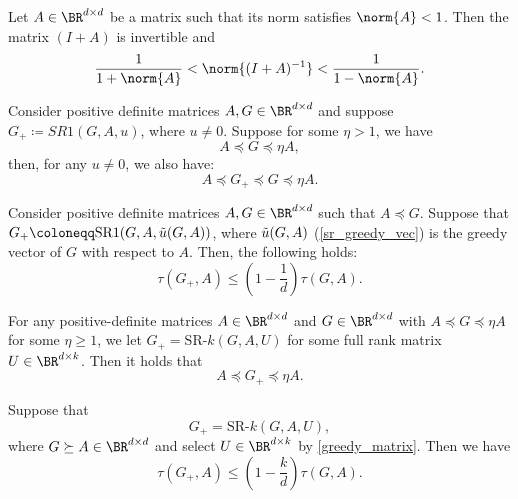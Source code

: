 \begin{lemma}
    Let $A \in \BR^{d \times d}$ be a matrix such that its norm satisfies $\norm{A} < 1$. Then the matrix $(I + A)$ is invertible and 
    \begin{equation*}
        \frac{1}{1 + \norm{A}} < \norm{(I + A)^{-1}} < \frac{1}{1 - \norm{A}}. 
    \end{equation*}
    \label{lemma:banach}
\end{lemma}
\begin{lemma}
    Consider positive definite matrices $A, G \in \BR^{d \times d}$ and suppose $G_{+} \coloneqq SR1(G, A, u)$, where $u \neq 0$. Suppose for some $\eta > 1$, we have
    \begin{equation*}
        A \preceq G \preceq \eta A,
    \end{equation*}
    then, for any $u \neq 0$, we also have:
    \begin{equation*}
        A \preceq G_{+} \preceq G \preceq \eta A.
    \end{equation*}
    \label{lemma:sr1_one_step}
\end{lemma}
\begin{lemma}
    Consider positive definite matrices $A, G \in \BR^{d \times d}$ such that $A \preceq G$. Suppose that $G_{+} \coloneqq \textrm{SR1}(G, A, \Tilde{u}(G, A))$, where $\Tilde{u}(G, A)$  (\eqref{sr_greedy_vec}) is the greedy vector of $G$ with respect to $A$. Then, the following holds:
    \begin{equation*}
        \tau(G_{+}, A) \leq \left(1 - \frac{1}{d}\right) \tau(G, A).
    \end{equation*}
    \label{lemma:sr1_one_step_2}
\end{lemma}
\begin{lemma}
    For any positive-definite matrices $A \in \BR^{d \times d}$ and $G \in \BR^{d \times d}$ with $A \preceq G \preceq \eta A$ for some $\eta \geq 1$, we let $G_{+} = \mathrm{SR}\textrm{-}k(G, A, U)$ for some full rank matrix $U \in \BR^{d\times k}$.
    Then it holds that
    \begin{equation}
        A \preceq G_{+} \preceq \eta A.
    \end{equation}
    \label{lemma:srk_update_consist}
\end{lemma}
\begin{lemma}
    Suppose that 
    \begin{equation*}
        G_+ = \mathrm{SR}\textrm{-}k(G, A, U),
    \end{equation*}
    where $G \succeq A \in \BR^{d \times d}$ and select $U \in \BR^{d \times k}$ by \eqref{greedy_matrix}. Then we have
    \begin{equation}
        \tau(G_{+}, A) \leq \left( 1 - \frac{k}{d}\right) \tau(G, A).
    \end{equation}
    \label{lemma:srk_one_step}
\end{lemma}

